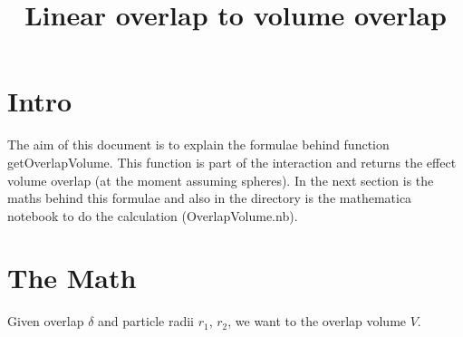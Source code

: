 \documentclass[fontsize=12pt, paper=a4]{report}
\title{Linear overlap to volume overlap}
\newcommand{\m}[1]{\left[\begin{array}{cc}#1\end{array}\right]}
\begin{document}
\maketitle

\chapter{Intro}

The aim of this document is to explain the formulae behind function getOverlapVolume. This function is part of the interaction and returns the effect volume overlap (at the moment assuming spheres). In the next section is the maths behind this formulae and also in the directory is the mathematica notebook to do the calculation (OverlapVolume.nb). 

\chapter{The Math}
Given overlap $\delta$ and particle radii $r_1$, $r_2$, we want to the overlap volume $V$.
\end{document}
